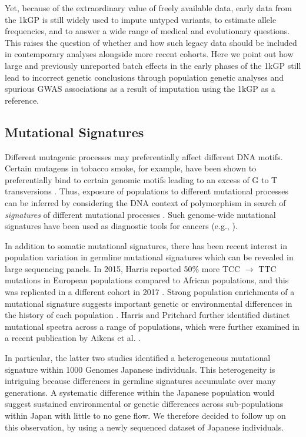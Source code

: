 \documentclass[9pt,lineno]{elife}
\begin{document}
Yet, because of the extraordinary value of freely available data, early data from the 1kGP is still widely used to impute untyped variants, to estimate allele frequencies, and to answer a wide range of medical and evolutionary questions.
This raises the question of whether and how such legacy data should be included in contemporary analyses alongside more recent cohorts.
Here we point out how large and previously unreported batch effects in the early phases of the 1kGP still lead to incorrect genetic conclusions through population genetic analyses and spurious GWAS associations as a result of imputation using the 1kGP as a reference.

\subsection{Mutational Signatures}

Different mutagenic processes may preferentially affect different DNA motifs. 
Certain mutagens in tobacco smoke, for example, have been shown to preferentially bind to certain genomic motifs leading to an excess of G to T transversions \citep{Pfeifer2002,Pleasance2010}. 
Thus, exposure of populations to different mutational processes can be inferred by considering the DNA context of polymorphism in search of \textit{signatures} of different mutational processes \citep{Alexandrov2013,Shiraishi2015a}. 
Such genome-wide mutational signatures have been used as diagnostic tools for cancers (e.g., \cite{Alexandrov2013,Shiraishi2015a}).

In addition to somatic mutational signatures, there has been recent interest in population variation in germline mutational signatures which can be revealed in large sequencing panels. 
In 2015, Harris reported 50\% more TCC ${\rightarrow}$ TTC mutations in European populations compared to African populations, and this was replicated in a different cohort in 2017 \citep{Harris2015a, Harris2017a, Mathieson2017a}. 
Strong population enrichments of a mutational signature suggests important genetic or environmental differences in the history of each population \citep{Harris2015a, Harris2017a}. 
Harris and Pritchard further identified distinct mutational spectra across a range of populations, which were further examined in a recent publication by Aikens et al. \citep{Harris2017a,Aikens2018}.
 
In particular, the latter two studies  identified a heterogeneous mutational signature within 1000 Genomes Japanese individuals.
This heterogeneity is intriguing because differences in germline signatures accumulate over many generations.
A systematic difference within the Japanese population would suggest sustained environmental or genetic differences across sub-populations within Japan with little to no gene flow.
We therefore decided to follow up on this observation, by using a newly sequenced dataset of Japanese individuals. 
\end{document}
